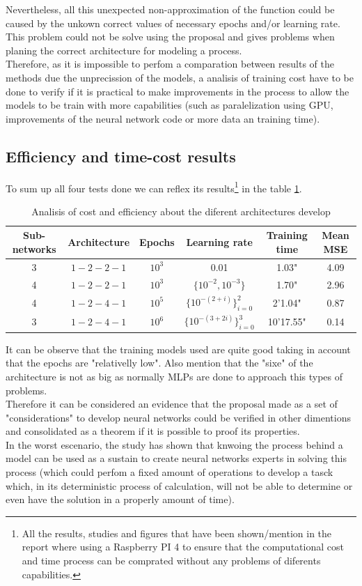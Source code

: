 \documentclass[a4paper, 11pt]{article}
\begin{document}
Nevertheless, all this unexpected non-approximation of the function could be caused by the unkown correct values of necessary epochs and/or learning rate.\\
This problem could not be solve using the proposal and gives problems when planing the correct architecture for modeling a process.\\
Therefore, as it is impossible to perfom a comparation between results of the methods due the unprecission of the models, a analisis of training cost have to be done to verify if it is practical to make improvements in the process to allow the models to be train with more capabilities (such as paralelization using GPU, improvements of the neural network code or more data an training time). 

\subsection{Efficiency and time-cost results}
To sum up all four tests done we can reflex its results\footnote{All the results, studies and figures that have been shown/mention in the report where using a Raspberry PI 4 to ensure that the computational cost and time process can be comprated without any problems of diferents capabilities.} in the table \ref{efficiency-table}.\\
\begin{table}[h]
    \centering
    \begin{tabular}{c|c|c|c|c|c}
        Sub-networks & Architecture & Epochs & Learning rate & Training time & Mean MSE\\\hline\hline
        3 & $1-2-2-1$ & $10^3$ & 0.01 & 1.03" & 4.09 \\\hline
        4 & $1-2-2-1$ & $10^3$ & $\{10^{-2}, 10^{-3}\}$ & 1.70" & 2.96 \\\hline
        4 & $1-2-4-1$ & $10^5$ & $\{10^{-(2+i)}\}_{i=0}^{2}$& 2'1.04" & 0.87 \\\hline
        3 & $1-2-4-1$ & $10^6$ & $\{10^{-(3+2i)}\}_{i=0}^{3}$& 10'17.55" &  0.14\\
    \end{tabular}
    \caption{Analisis of cost and efficiency about the diferent architectures develop}
    \label{efficiency-table}
\end{table}
It can be observe that the training models used are quite good taking in account that the epochs are "relativelly low". Also mention that the "sixe" of the architecture is not as big as normally MLPs are done to approach this types of problems.\\
Therefore it can be considered an evidence that the proposal made as a set of "considerations" to develop neural networks could be verified in other dimentions and consolidated as a theorem if it is possible to proof its properties.\\
In the worst escenario, the study has shown that knwoing the process behind a model can be used as a sustain to create neural networks experts in solving this process (which could perfom a fixed amount of operations to develop a tasck which, in its deterministic process of calculation, will not be able to determine or even have the solution in a properly amount of time).
\end{document}
